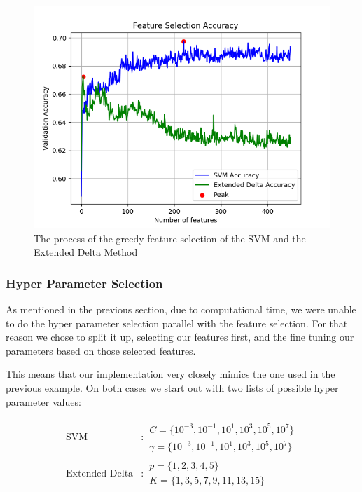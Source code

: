 \begin{figure}
    \centering
    \includegraphics[scale=0.8]{./pictures/experiments/feature_selection.png}
    \caption{The process of the greedy feature selection of the SVM and the Extended Delta Method}
    \label{fig:fs_results}
\end{figure}


\subsubsection{Hyper Parameter Selection}\label{sec:hyp_select}

As mentioned in the previous section, due to computational time, we were unable
to do the hyper parameter selection parallel with the feature selection.
For that reason we chose to split it up, selecting our features first, and the
fine tuning our parameters based on those selected features.

This means that our implementation very closely mimics the one used in the
previous example. On both cases we start out with two lists of possible hyper
parameter values:

\begin{align}
    \text{SVM} &:
    \begin{array}{lr}
        C=\{10^{-3}, 10^{-1}, 10^{1}, 10^{3}, 10^{5}, 10^7\}\\
        \gamma=\{10^{-3}, 10^{-1}, 10^{1}, 10^{3}, 10^{5}, 10^7\}
    \end{array} \\
    \text{Extended Delta} &:
    \begin{array}{lr}
        p=\{1,2,3,4,5\}\\
        K=\{1,3,5,7,9,11,13,15\}
    \end{array}
\end{align}

